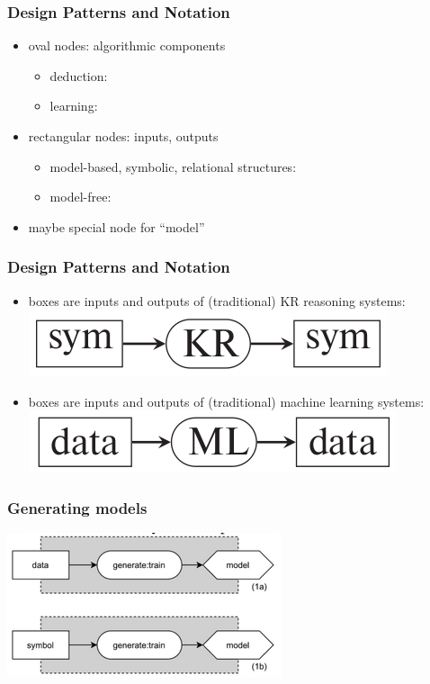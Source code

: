 \documentclass{beamer}
\begin{document}
\begin{frame}
  \frametitle{Design Patterns and Notation}
  \begin{itemize}
  \item oval nodes: algorithmic components
    \begin{itemize}
    \item deduction: 
    \item learning: 
    \end{itemize}
  \item rectangular nodes: inputs, outputs
    \begin{itemize}
    \item model-based, symbolic, relational structures: 
    \item model-free: 
    \end{itemize}
  \item maybe special node for ``model''
  \end{itemize}
\end{frame}

\begin{frame}
  \frametitle{Design Patterns and Notation}
  \begin{itemize}
  \item {} boxes are inputs and outputs of (traditional) KR
    reasoning systems:
    \includegraphics[width=.25\textwidth]{ns1.png}
  \item {} boxes are inputs and outputs of (traditional)
    machine learning systems:
    \includegraphics[width=.25\textwidth]{ns2.png}
  \end{itemize}
\end{frame}

\begin{frame}
  \frametitle{Generating models}
  \centering
  \includegraphics[width=.5\textwidth]{ns3.png}
\end{frame}
\end{document}

